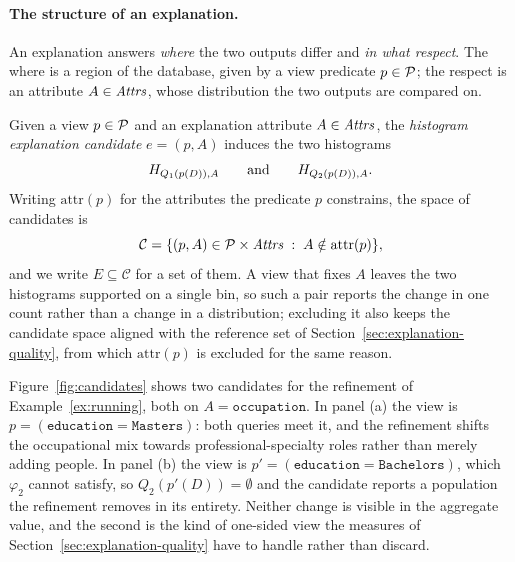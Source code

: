 \paragraph{The structure of an explanation.}
An explanation answers \emph{where} the two outputs differ and \emph{in what respect}.
The where is a region of the database, given by a view predicate $p\in\mathcal{P}$; the respect is an attribute $A\in\mathit{Attrs}$, whose distribution the two outputs are compared on.

\begin{definition}
\label{def:candidate}
Given a view $p\in\mathcal{P}$ and an explanation attribute $A\in\mathit{Attrs}$, the \emph{histogram explanation candidate} $e=(p,A)$ induces the two histograms
\[
    H_{Q_1(p(D)),A}
    \qquad\text{and}\qquad
    H_{Q_2(p(D)),A}.
\]
Writing $\mathrm{attr}(p)$ for the attributes the predicate $p$ constrains, the space of candidates is
\[
\mathcal{C}=\{(p,A)\in\mathcal{P}\times\mathit{Attrs} \;:\; A\notin\mathrm{attr}(p)\},
\]
and we write $E\subseteq\mathcal{C}$ for a set of them.
A view that fixes $A$ leaves the two histograms supported on a single bin, so such a pair reports the change in one count rather than a change in a distribution; excluding it also keeps the candidate space aligned with the reference set of Section~\ref{sec:explanation-quality}, from which $\mathrm{attr}(p)$ is excluded for the same reason.
\end{definition}

\begin{example}
\label{ex:candidate}
Figure~\ref{fig:candidates} shows two candidates for the refinement of Example~\ref{ex:running}, both on $A=\texttt{occupation}$.
In panel (a) the view is $p=(\texttt{education}=\texttt{Masters})$: both queries meet it, and the refinement shifts the occupational mix towards professional-specialty roles rather than merely adding people.
In panel (b) the view is $p'=(\texttt{education}=\texttt{Bachelors})$, which $\varphi_2$ cannot satisfy, so $Q_2(p'(D))=\emptyset$ and the candidate reports a population the refinement removes in its entirety.
Neither change is visible in the aggregate value, and the second is the kind of one-sided view the measures of Section~\ref{sec:explanation-quality} have to handle rather than discard.
\end{example}

